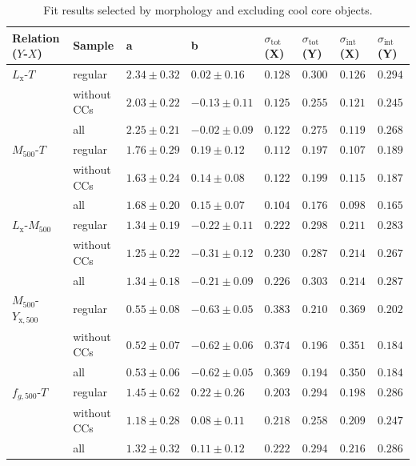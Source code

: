 \documentclass[structabstract]{aa}
\begin{document}
\begin{table}
  \caption{Fit results selected by morphology and excluding cool core objects.}
  \begin{center}
    \setlength\extrarowheight{2pt}
    \begin{tabularx}{\linewidth}{X X XXllll}
      \hline\hline
      Relation ($Y$-$X$) & Sample & a & b & $\sigma_{\text{tot}}$ (X) & $\sigma_{\text{tot}}$ (Y) & $\sigma_{\text{int}}$ (X) & $\sigma_{\text{int}}$ (Y) \\ \hline
$L_{\text{x}}$-$T$ & regular & $2.34 \pm 0.32$ & $0.02 \pm 0.16$ & $0.128$ & $0.300$ & $0.126$ & $0.294$ \\ 
 & without CCs & $2.03 \pm 0.22$ & $-0.13 \pm 0.11$ & $0.125$ & $0.255$ & $0.121$ & $0.245$ \\ 
 & all & $2.25 \pm 0.21$ & $-0.02 \pm 0.09$ & $0.122$ & $0.275$ & $0.119$ & $0.268$ \\ \hline
$M_{500}$-$T$ & regular & $1.76 \pm 0.29$ & $0.19 \pm 0.12$ & $0.112$ & $0.197$ & $0.107$ & $0.189$ \\ 
 & without CCs & $1.63 \pm 0.24$ & $0.14 \pm 0.08$ & $0.122$ & $0.199$ & $0.115$ & $0.187$ \\ 
 & all & $1.68 \pm 0.20$ & $0.15 \pm 0.07$ & $0.104$ & $0.176$ & $0.098$ & $0.165$ \\ \hline
$L_{\text{x}}$-$M_{500}$ & regular & $1.34 \pm 0.19$ & $-0.22 \pm 0.11$ & $0.222$ & $0.298$ & $0.211$ & $0.283$ \\ 
 & without CCs & $1.25 \pm 0.22$ & $-0.31 \pm 0.12$ & $0.230$ & $0.287$ & $0.214$ & $0.267$ \\ 
 & all & $1.34 \pm 0.18$ & $-0.21 \pm 0.09$ & $0.226$ & $0.303$ & $0.214$ & $0.287$ \\ \hline
$M_{500}$-$Y_{\text{x},500}$ & regular & $0.55 \pm 0.08$ & $-0.63 \pm 0.05$ & $0.383$ & $0.210$ & $0.369$ & $0.202$ \\ 
 & without CCs & $0.52 \pm 0.07$ & $-0.62 \pm 0.06$ & $0.374$ & $0.196$ & $0.351$ & $0.184$ \\ 
 & all & $0.53 \pm 0.06$ & $-0.62 \pm 0.05$ & $0.369$ & $0.194$ & $0.350$ & $0.184$ \\ \hline
$f_{g,500}$-$T$ & regular & $1.45 \pm 0.62$ & $0.22 \pm 0.26$ & $0.203$ & $0.294$ & $0.198$ & $0.286$ \\ 
 & without CCs & $1.18 \pm 0.28$ & $0.08 \pm 0.11$ & $0.218$ & $0.258$ & $0.209$ & $0.247$ \\ 
 & all & $1.32 \pm 0.32$ & $0.11 \pm 0.12$ & $0.222$ & $0.294$ & $0.216$ & $0.286$ \\ \hline
\end{tabularx}
    \label{tab:fitsmorphcc}
  \end{center}
\end{table}
\end{document}
